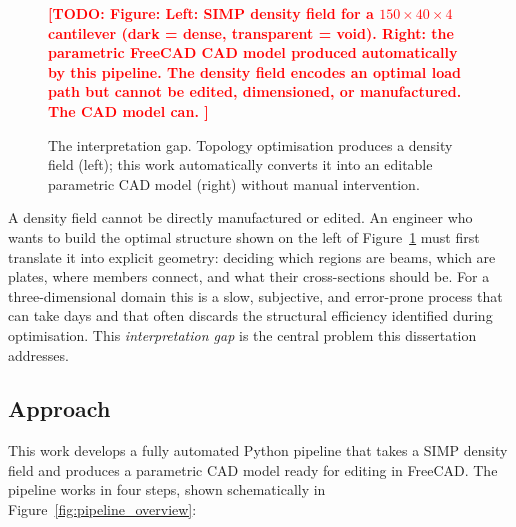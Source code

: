 \documentclass[11pt,a4paper]{article}
\newcommand{\TODO}[1]{\textcolor{red}{\textbf{[TODO: #1]}}}
\newcommand{\figstub}[2]{%
  \begin{figure}[htbp]\centering
    \TODO{Figure: #1}\caption{#2}\end{figure}}
\begin{document}
\figstub{%
  Left: SIMP density field for a $150\times40\times4$ cantilever (dark = dense,
  transparent = void). Right: the parametric FreeCAD CAD model produced
  automatically by this pipeline. The density field encodes an optimal load
  path but cannot be edited, dimensioned, or manufactured. The CAD model can.
}{%
  The interpretation gap. Topology optimisation produces a density field
  (left); this work automatically converts it into an editable parametric
  CAD model (right) without manual intervention.%
  \label{fig:intro_gap}}

\noindent
A density field cannot be directly manufactured or edited.
An engineer who wants to build the optimal structure shown on the left of
Figure~\ref{fig:intro_gap} must first translate it into explicit geometry:
deciding which regions are beams, which are plates, where members connect,
and what their cross-sections should be.
For a three-dimensional domain this is a slow, subjective, and error-prone
process that can take days and that often discards the structural efficiency
identified during optimisation.
This \emph{interpretation gap} is the central problem this dissertation
addresses.

\subsection{Approach}
\label{subsec:approach}


This work develops a fully automated Python pipeline that takes a SIMP density
field and produces a parametric CAD model ready for editing in FreeCAD.
The pipeline works in four steps, shown schematically in
Figure~\ref{fig:pipeline_overview}:
\end{document}

